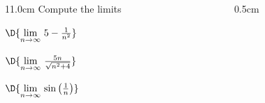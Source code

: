 \begin{frame}
\frametitle{}
\scriptsize

\vspace{0.2cm}

\begin{columns}
\begin{column}{11.0cm}
Compute the limits

\vspace{0.2cm}

$\D{\lim \limits_{n \to \infty}\, 5 - \frac{1}{n^2}}$

\vspace{2.2cm}

$\D{\lim \limits_{n \to \infty}\, \frac{5n}{\sqrt{n^2+4}}}$

\vspace{2.2cm}

$\D{\lim \limits_{n \to \infty}\, \sin\left(\frac{1}{n}\right)}$

\vspace{3.5cm}

\end{column}
\begin{column}{0.5cm}
	
\end{column}
\end{columns}
\end{frame}

